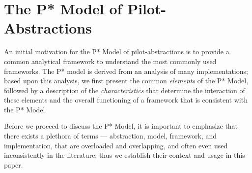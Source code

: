 \documentclass[conference]{IEEEtran}
\begin{document}





\section{The P* Model of Pilot-\\Abstractions}
\label{sec:pilot-model}

An initial motivation for the P* Model of pilot-abstractions is to
provide a common analytical framework to understand the most commonly
used \pilotjob frameworks.  The P* model is derived from an analysis of many
\pilotjob implementations; based upon this analysis, we first present
the common {\it elements} of the P* Model, followed by a description
of the {\it characteristics} that determine the interaction of these
elements and the overall functioning of a \pilotjob framework that is
consistent with the P* Model.  

Before we proceed to discuss the P* Model, it is important to
emphasize that there exists a plethora of terms --- abstraction,
model, framework, and implementation, that are overloaded and
overlapping, and often even used inconsistently in the literature;
thus we establish their context and usage in this paper.

\end{document}
